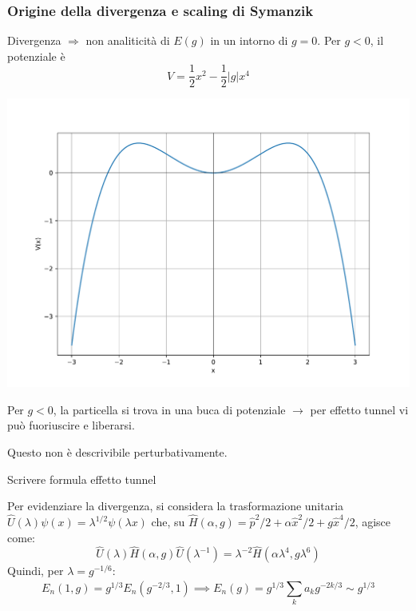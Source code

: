 \documentclass[10pt]{beamer}
\begin{document}
  \begin{frame}
\frametitle{Origine della divergenza e scaling di Symanzik}
Divergenza $\Rightarrow $ non analiticit\`a di $E(g)$ in un intorno di $g=0$. 
Per $g<0$, il potenziale \`e
\begin{equation*}
	V= \frac{1}{2}x^2 - \frac{1}{2}\lvert g \rvert x^4
\end{equation*}
  \begin{minipage}{0.45\textwidth}
    	\centering
    	\includegraphics[width=\columnwidth]{f1.pdf}
  \end{minipage}%
  \hfill
  \begin{minipage}{0.5\textwidth}
	  Per $g<0$, la particella si trova in una buca di potenziale $\to$ per effetto tunnel vi pu\`o fuoriuscire e liberarsi.

	  Questo non \`e descrivibile perturbativamente.
  \end{minipage}
  \begin{center}
	  \color{red} Scrivere formula effetto tunnel
  \end{center}
  Per evidenziare la divergenza, si considera la trasformazione unitaria $\hat{U}(\lambda ) \psi (x) = \lambda ^{1 / 2} \psi (\lambda x)$ che, su $\hat{H}(\alpha ,g) = \hat{p}^2 / 2 + \alpha  \hat{x}^2 / 2 + g \hat{x}^4 / 2$, agisce come:
  \begin{equation*}
  	\hat{U}(\lambda ) \hat{H}(\alpha ,g) \hat{U}(\lambda ^{-1} ) = \lambda ^{-2} \hat{H}(\alpha  \lambda ^4, g \lambda ^6)
  \end{equation*}
  Quindi, per $\lambda  = g^{- 1 / 6} $:
  \[
  E_n(1,g) = g^{1 / 3} E_n(g^{-2 / 3} , 1) \implies E_n(g) = g^{1 /3 }  \sum_{k}^{} a_k g^{-2k/3} \sim g^{1 / 3} 
  \] 
  
  \end{frame} 
\end{document}
